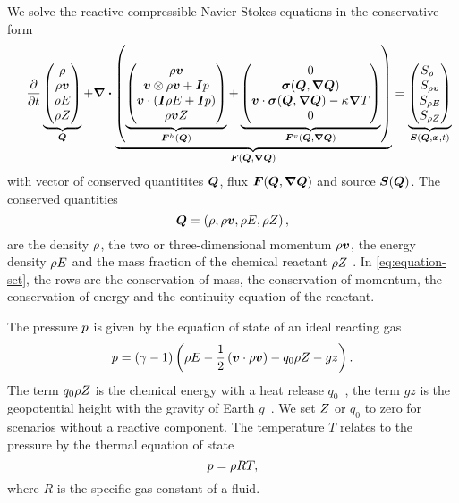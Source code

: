 \documentclass[runningheads]{llncs}
\newcommand{\eqA}{}
\newcommand{\eqB}{(}
\newcommand{\eqMultiA}{(}
\newcommand{\eqMultiB}{)}
\DeclareRobustCommand{\pcrefSingle}[1]{%
\begingroup%
  \renewcommand{\eqA}{(}\renewcommand{\eqB}{}%
\cref{#1}%
\endgroup%
}
\DeclareRobustCommand{\pcrefMulti}[1]{%
\begingroup%
    \renewcommand{\eqMultiA}{}\renewcommand{\eqMultiB}{}%
    (\cref{#1})%
\endgroup%
}
\DeclareRobustCommand{\pcref}[1]{%
\IfSubStr{#1}{,}{\pcrefMulti{#1}}{\pcrefSingle{#1}}%
}
\begin{document}
We  solve the reactive compressible Navier-Stokes equations in the conservative form%
\begin{equation}
 \label{eq:equation-set} 
\quad
  \pdv{}{t}
  \underbrace{
  \begin{pmatrix}
    \Qrho\\
    \Qj\\
    \QE\\
    \QZ
    \end{pmatrix}}_{\Q}
  +
  \divergence{
  \underbrace{
  \left(
   \underbrace{\hyperFluxDef}_{\hyperFlux(\Q)}
+
\underbrace{\viscFluxDef}_{\viscFlux(\Q, \gradQ)}
  \right)}_{\flux(\Q, \gradQ)}}
 =
  \underbrace{
  \begin{pmatrix}
    \source[\Qrho\phantom{\Qrho}]\\
    \source[\Qj]\\
    \source[\QE]\\
    \source[\QZ]
    \end{pmatrix}}_{\source(\Q, \bm{x}, t)}
\end{equation}
with vector of conserved quantitites $\bm{Q}$, flux $\flux(\Q, \gradQ)$ and source $\source(\Q)$.
The conserved quantities
\begin{equation} 
  \label{eq:conserved-variables}
 \bm{Q} = \left( \rho, \rho \bm{v}, \rho E, \rho Z \right),
\end{equation}
are the density $\rho$, the two or three-dimensional momentum $\rho \bm{v}$, the energy density $\rho E$ and the mass fraction of the chemical reactant $\rho Z$ .
In \cref{eq:equation-set}, the rows are the conservation of mass, the conservation of momentum, the conservation of energy and the continuity equation of the reactant.

The pressure $p$ is given by the equation of state of an ideal reacting gas
\begin{equation}
  \label{eq:eos}
  p = (\gamma - 1) \left(\rho E - \frac{1}{2} \left(\bm{v} \cdot \rho \bm{v} \right)  - q_0 \rho Z - gz \right).
\end{equation}
The term $q_0 \rho Z$ is the chemical energy with a heat release $q_0$~\cite{helzel2000modified}, the term $gz$ is the geopotential height with the gravity of Earth $g$~\cite{giraldo2008study}.
We set $Z$ or $q_0$ to zero for scenarios without a reactive component.
The temperature $T$ relates to the pressure by the thermal equation of state
\begin{equation}
  \label{eq:temperature}
  p = \rho R T,
\end{equation}
where $R$ is the specific gas constant of a fluid.
\end{document}
